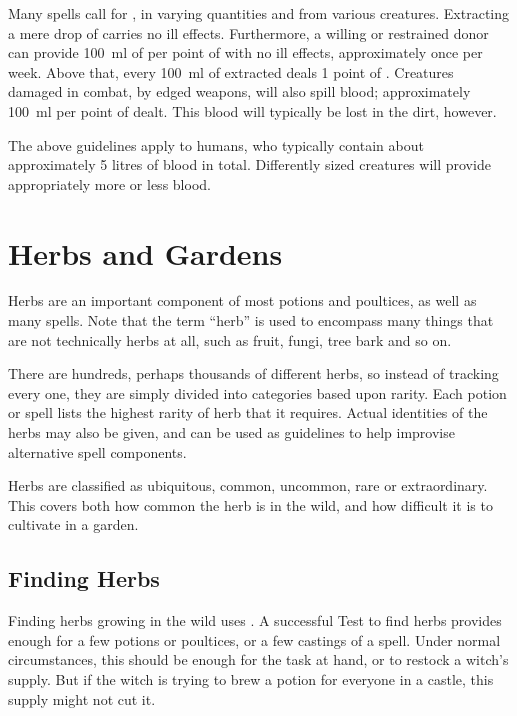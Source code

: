 Many spells call for , in varying quantities and from various creatures.
Extracting a mere drop of  carries no ill effects.
Furthermore, a willing or restrained donor can provide \SI{100}{\milli\litre} of  per point of  with no ill effects, approximately once per week.
Above that, every \SI{100}{\milli\litre} of  extracted deals 1 point of {\damage}.
Creatures damaged in combat, by edged weapons, will also spill blood; approximately \SI{100}{\milli\litre} per point of {\damage} dealt.
This blood will typically be lost in the dirt, however.

The above guidelines apply to humans, who typically contain about approximately 5 litres of blood in total.
Differently sized creatures will provide appropriately more or less blood.


\section{Herbs and Gardens}

Herbs are an important component of most potions and poultices, as well as many spells.
Note that the term ``herb'' is used to encompass many things that are not technically herbs at all, such as fruit, fungi, tree bark and so on.

There are hundreds, perhaps thousands of different herbs, so instead of tracking every one, they are simply divided into categories based upon rarity.
Each potion or spell lists the highest rarity of herb that it requires.
Actual identities of the herbs may also be given, and can be used as guidelines to help improvise alternative spell components.

Herbs are classified as ubiquitous, common, uncommon, rare or extraordinary.
This covers both how common the herb is in the wild, and how difficult it is to cultivate in a garden.

\subsection{Finding Herbs}

Finding herbs growing in the wild uses .
A successful Test to find herbs provides enough for a few potions or poultices, or a few castings of a spell.
Under normal circumstances, this should be enough for the task at hand, or to restock a witch's supply.
But if the witch is trying to brew a potion for everyone in a castle, this supply might not cut it.

